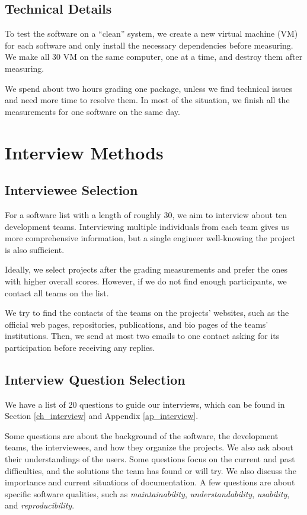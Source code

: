 \subsection{Technical Details}
\label{sec_technical_details}
To test the software on a ``clean'' system, we create a new virtual machine (VM) for each software and only install the necessary dependencies before measuring. We make all 30 VM on the same computer, one at a time, and destroy them after measuring.

We spend about two hours grading one package, unless we find technical issues and need more time to resolve them. In most of the situation, we finish all the measurements for one software on the same day.

\section{Interview Methods}
\label{sec_interview_methods}

\subsection{Interviewee Selection}
For a software list with a length of roughly 30, we aim to interview about ten development teams. Interviewing multiple individuals from each team gives us more comprehensive information, but a single engineer well-knowing the project is also sufficient.

Ideally, we select projects after the grading measurements and prefer the ones with higher overall scores. However, if we do not find enough participants, we contact all teams on the list.

We try to find the contacts of the teams on the projects' websites, such as the official web pages, repositories, publications, and bio pages of the teams' institutions. Then, we send at most two emails to one contact asking for its participation before receiving any replies.

\subsection{Interview Question Selection}

We have a list of 20 questions to guide our interviews, which can be found in Section \ref{ch_interview} and Appendix \ref{ap_interview}.

Some questions are about the background of the software, the development teams, the interviewees, and how they organize the projects. We also ask about their understandings of the users. Some questions focus on the current and past difficulties, and the solutions the team has found or will try. We also discuss the importance and current situations of documentation. A few questions are about specific software qualities, such as \textit{maintainability}, \textit{understandability}, \textit{usability}, and \textit{reproducibility}.


